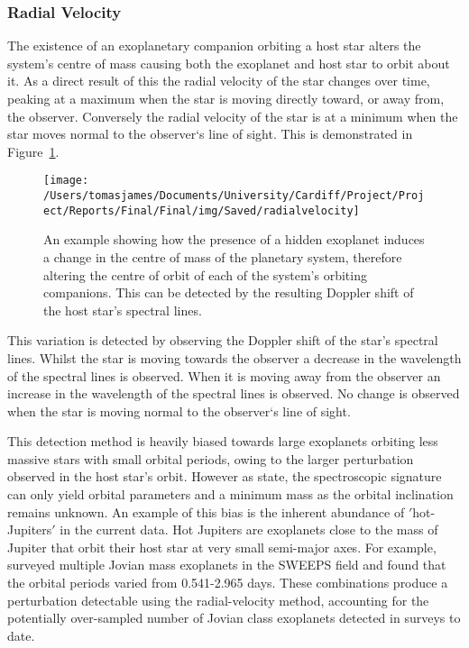 \documentclass{report}
\begin{document}
\subsubsection{Radial Velocity }
The existence of an exoplanetary companion orbiting a host star alters the system's centre of mass causing both the exoplanet and host star to orbit about it. As a direct result of this the radial velocity of the star changes over time, peaking at a maximum when the star is moving directly toward, or away from, the observer. Conversely the radial velocity of the star is at a minimum when the star moves normal to the observer`s line of sight. This is demonstrated in Figure~\ref{rvdetect}.

\begin{figure}[H]
\centering
    \texttt{[image: /Users/tomasjames/Documents/University/Cardiff/Project/Project/Reports/Final/Final/img/Saved/radialvelocity]}
\caption[An example showing how the presence of a hidden exoplanet induces a change in the centre of mass of the planetary system, therefore altering the centre of orbit of each of the system's orbiting companions. This can be detected by the resulting Doppler shift of the host star's spectral lines.] {An example showing how the presence of a hidden exoplanet induces a change in the centre of mass of the planetary system, therefore altering the centre of orbit of each of the system's orbiting companions. This can be detected by the resulting Doppler shift of the host star's spectral lines. \parencite{rvdetect}}\label{rvdetect}
\end{figure}

This variation is detected by observing the Doppler shift of the star’s spectral lines. Whilst the star is moving towards the observer a decrease in the wavelength of the spectral lines is observed. When it is moving away from the observer an increase in the wavelength of the spectral lines is observed. No change is observed when the star is moving normal to the observer`s line of sight. 

This detection method is heavily biased towards large exoplanets orbiting less massive stars with small orbital periods, owing to the larger perturbation observed in the host star’s orbit. However as \textcite{stats} state, the spectroscopic signature can only yield orbital parameters and a minimum mass as the orbital inclination remains unknown. An example of this bias is the inherent abundance of $'$hot-Jupiters$'$ in the current data. Hot Jupiters are exoplanets close to the mass of Jupiter that orbit their host star at very small semi-major axes. For example, \textcite{sweeps} surveyed multiple Jovian mass exoplanets in the SWEEPS field and found that the orbital periods varied from 0.541-2.965 days. These combinations produce a perturbation detectable using the radial-velocity method, accounting for the potentially over-sampled number of Jovian class exoplanets detected in surveys to date.
\end{document}
